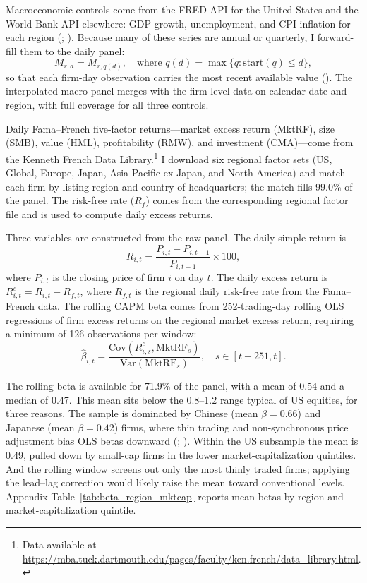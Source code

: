 \documentclass{article}
\theoremstyle{plain}
\begin{document}
Macroeconomic controls come from the FRED API for the United States and the World Bank API elsewhere: GDP growth, unemployment, and CPI inflation for each region (\cite{FederalReserveBankofStLouis2025}; \cite{WorldBank2025}). Because many of these series are annual or quarterly, I forward-fill them to the daily panel:
\begin{equation}
M_{r,d} = M_{r,q(d)}, \quad \text{where } q(d) = \max \{q : \text{start}(q) \leq d\},
\end{equation}
so that each firm-day observation carries the most recent available value (\cite{StockWatson2008}). The interpolated macro panel merges with the firm-level data on calendar date and region, with full coverage for all three controls.

Daily Fama--French five-factor returns---market excess return (MktRF), size (SMB), value (HML), profitability (RMW), and investment (CMA)---come from the Kenneth French Data Library.\footnote{Data available at \url{https://mba.tuck.dartmouth.edu/pages/faculty/ken.french/data_library.html}.} I download six regional factor sets (US, Global, Europe, Japan, Asia Pacific ex-Japan, and North America) and match each firm by listing region and country of headquarters; the match fills 99.0\% of the panel. The risk-free rate ($R_f$) comes from the corresponding regional factor file and is used to compute daily excess returns.

Three variables are constructed from the raw panel. The daily simple return is
\begin{equation}
R_{i,t} = \frac{P_{i,t} - P_{i,t-1}}{P_{i,t-1}} \times 100,
\end{equation}
where $P_{i,t}$ is the closing price of firm $i$ on day $t$. The daily excess return is $R^e_{i,t} = R_{i,t} - R_{f,t}$, where $R_{f,t}$ is the regional daily risk-free rate from the Fama--French data. The rolling CAPM beta comes from 252-trading-day rolling OLS regressions of firm excess returns on the regional market excess return, requiring a minimum of 126 observations per window:
\begin{equation}
\hat{\beta}_{i,t} = \frac{\text{Cov}(R^e_{i,s}, \text{MktRF}_s)}{\text{Var}(\text{MktRF}_s)}, \quad s \in [t-251, t].
\end{equation}

The rolling beta is available for 71.9\% of the panel, with a mean of 0.54 and a median of 0.47. This mean sits below the 0.8--1.2 range typical of US equities, for three reasons. The sample is dominated by Chinese (mean $\beta = 0.66$) and Japanese (mean $\beta = 0.42$) firms, where thin trading and non-synchronous price adjustment bias OLS betas downward (\cite{ScholesWilliams1977}; \cite{Dimson1979}). Within the US subsample the mean is 0.49, pulled down by small-cap firms in the lower market-capitalization quintiles. And the rolling window screens out only the most thinly traded firms; applying the \textcite{Dimson1979} lead--lag correction would likely raise the mean toward conventional levels. Appendix Table~\ref{tab:beta_region_mktcap} reports mean betas by region and market-capitalization quintile.
\end{document}
